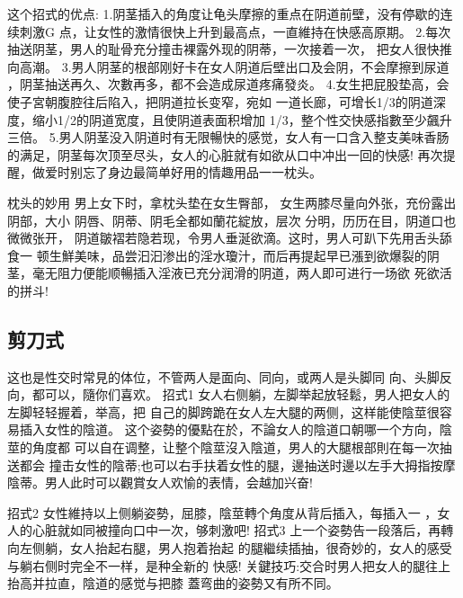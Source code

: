 \documentclass[12pt,UTF8]{ctexbook}
\begin{document}
这个招式的优点:
1.阴茎插入的角度让龟头摩擦的重点在阴道前壁，没有停歇的连续刺激G
点，让女性的激情很快上升到最高点，一直維持在快感高原期。
2.每次抽送阴茎，男人的耻骨充分撞击裸露外现的阴蒂，一次接着一次，
把女人很快推向高潮。
3.男人阴茎的根部刚好卡在女人阴道后壁出口及会阴，不会摩擦到尿道
，阴茎抽送再久、次數再多，都不会造成尿道疼痛發炎。
4.女生把屁股垫高，会使子宮朝腹腔往后陷入，把阴道拉长变窄，宛如
一道长廊，可增长1/3的阴道深度，缩小1/2的阴道宽度，且使阴道表面积增加
1/3，整个性交快感指數至少飆升三倍。
5.男人阴茎没入阴道时有无限暢快的感觉，女人有一口含入整支美味香肠
的满足，阴茎每次顶至尽头，女人的心脏就有如欲从口中冲出一回的快感!
再次提醒，做爱时别忘了身边最简单好用的情趣用品一一枕头。

枕头的妙用
男上女下时，拿枕头垫在女生臀部，
女生两膝尽量向外张，充份露出阴部，大小
阴唇、阴蒂、阴毛全都如蘭花綻放，层次
分明，历历在目，阴道口也微微张开，
阴道皺褶若隐若现，令男人垂涎欲滴。这时，男人可趴下先用舌头舔食一
顿生鮮美味，品尝汩汩渗出的淫水瓊汁，而后再提起早已漲到欲爆裂的阴
茎，毫无阻力便能顺暢插入淫液已充分润滑的阴道，两人即可进行一场欲
死欲活的拼斗!

\subsection{剪刀式}

这也是性交时常見的体位，不管两人是面向、同向，或两人是头脚同
向、头脚反向，都可以，隨你们喜欢。
招式1
女人右侧躺，左脚举起放轻鬆，男人把女人的左脚轻轻握着，举高，把
自己的脚跨跪在女人左大腿的两侧，这样能使陰莖很容易插入女性的陰道。
这个姿勢的優點在於，不論女人的陰道口朝哪一个方向，陰莖的角度都
可以自在调整，让整个陰莖沒入陰道，男人的大腿根部則在每一次抽送都会
撞击女性的陰蒂;也可以右手扶着女性的腿，邊抽送时邊以左手大拇指按摩
陰蒂。男人此时可以觀賞女人欢愉的表情，会越加兴奋!

招式2
女性維持以上侧躺姿勢，屈膝，陰莖轉个角度从背后插入，每插入一
，女人的心脏就如同被撞向口中一次，够刺激吧!
招式3
上一个姿勢告一段落后，再轉向左侧躺，女人抬起右腿，男人抱着抬起
的腿繼续插抽，很奇妙的，女人的感受与躺右侧时完全不一样，是种全新的
快感!
关鍵技巧:交合时男人把女人的腿往上抬高并拉直，陰道的感觉与把膝
蓋弯曲的姿勢又有所不同。
\end{document}
